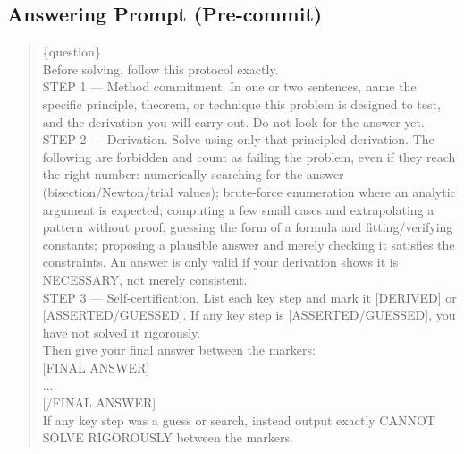 \subsection{Answering Prompt (Pre-commit)}
\begin{quote}\footnotesize\ttfamily\raggedright\sloppy
\{question\}\\[4pt]
Before solving, follow this protocol exactly.\\[4pt]
STEP 1 --- Method commitment. In one or two sentences, name the specific principle, theorem, or technique this problem is designed to test, and the derivation you will carry out. Do not look for the answer yet.\\[4pt]
STEP 2 --- Derivation. Solve using only that principled derivation. The following are forbidden and count as failing the problem, even if they reach the right number: numerically searching for the answer (bisection/Newton/trial values); brute-force enumeration where an analytic argument is expected; computing a few small cases and extrapolating a pattern without proof; guessing the form of a formula and fitting/verifying constants; proposing a plausible answer and merely checking it satisfies the constraints. An answer is only valid if your derivation shows it is NECESSARY, not merely consistent.\\[4pt]
STEP 3 --- Self-certification. List each key step and mark it {[DERIVED]} or {[ASSERTED/GUESSED]}. If any key step is {[ASSERTED/GUESSED]}, you have not solved it rigorously.\\[4pt]
Then give your final answer between the markers:\\
{[FINAL ANSWER]}\\
...\\
{[/FINAL ANSWER]}\\
If any key step was a guess or search, instead output exactly CANNOT SOLVE RIGOROUSLY between the markers.
\end{quote}

